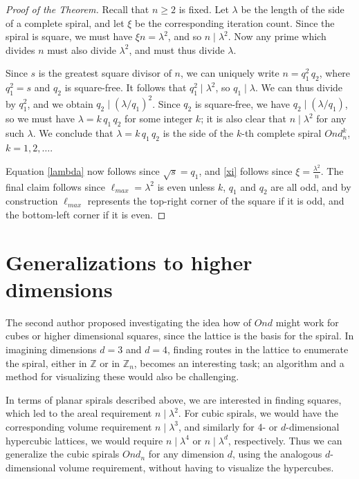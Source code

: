 \documentclass{article}
\theoremstyle{definition}
\def\ZZ{\mathbb{Z}}
\begin{document}
\begin{proof}[Proof of the Theorem]
  Recall that $n\ge 2$ is fixed.  Let $\lambda$ be the length of the
  side of a complete spiral, and let $\xi$ be the corresponding
  iteration count.  Since the spiral is square, we must have $\xi n =
  \lambda^2$, and so $n \mid  \lambda^2$.  Now any prime which divides
  $n$ must also divide $\lambda^2$, and must thus divide $\lambda$.

  Since $s$ is the greatest square divisor of $n$, we can uniquely
  write $n = q^2_1\, q_2$, where $q_1^2 = s$ and $q_2$ is square-free.
  It follows that $q_1^2\mid \lambda^2$, so $q_1\mid \lambda$.  We can thus
  divide by $q_1^2$, and we obtain $q_2 \mid  ({\lambda}/{q_1})^2$.  Since
  $q_2$ is square-free, we have $q_2\mid  ({\lambda}/{q_1})$, so we must
  have $\lambda = k \,q_1 \,q_2$ for some integer $k$; it is also
  clear that $n\mid \lambda^2$ for any such $\lambda$.  We conclude
  that $\lambda = k \,q_1\, q_2$ is the side of the $k$-th complete
  spiral $Ond^k_n$, $k = 1,2,\dots$.

  Equation \eqref{lambda} now follows since $\sqrt{s} = q_1$, and
  \eqref{xi} follows since $\xi = \frac{\lambda^2}{n}$.  The final
  claim follows since $\ell_{max} = \lambda^2$ is even unless $k$, $q_1$
  and $q_2$ are all odd, and by construction $\ell_{max}$ represents the
  top-right corner of the square if it is odd, and the bottom-left
  corner if it is even.
\end{proof}

\section{Generalizations to higher dimensions}

The second author proposed investigating the idea how of $Ond$ might
work for cubes or higher dimensional squares, since the lattice is the
basis for the spiral. In imagining dimensions $d = 3$ and $d=4$,
finding routes in the lattice to enumerate the spiral, either in $\ZZ$
or in $\ZZ_n$, becomes an interesting task; an algorithm and a method
for visualizing these would also be challenging.

In terms of planar spirals described above, we are interested in
finding squares, which led to the areal requirement $n\mid \lambda^2$. For
cubic spirals, we would have the corresponding volume requirement
$n\mid \lambda^3$, and similarly for 4- or $d$-dimensional hypercubic
lattices, we would require $n\mid \lambda^4$ or $n\mid \lambda^d$,
respectively.  Thus we can generalize the cubic spirals $Ond_n$ for
any dimension $d$, using the analogous $d$-dimensional volume
requirement, without having to visualize the hypercubes.
\end{document}
